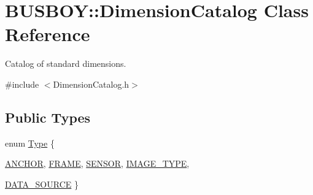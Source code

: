 \hypertarget{classBUSBOY_1_1DimensionCatalog}{
\section{BUSBOY::DimensionCatalog Class Reference}
\label{classBUSBOY_1_1DimensionCatalog}
}


Catalog of standard dimensions.  


{\ttfamily \#include $<$DimensionCatalog.h$>$}\subsection*{Public Types}
\begin{DoxyCompactItemize}
\item 
enum \hyperlink{classBUSBOY_1_1DimensionCatalog_a46badf3aaaba8629b5ccf8b63b4d1fe5}{Type} \{ \par
\hyperlink{classBUSBOY_1_1DimensionCatalog_a46badf3aaaba8629b5ccf8b63b4d1fe5a159ff66c002b825e50af94b6d855de92}{ANCHOR}, 
\hyperlink{classBUSBOY_1_1DimensionCatalog_a46badf3aaaba8629b5ccf8b63b4d1fe5a0334c4a83a6070bf9518079e5a69f970}{FRAME}, 
\hyperlink{classBUSBOY_1_1DimensionCatalog_a46badf3aaaba8629b5ccf8b63b4d1fe5aa12c5de92e87a7cf37114891062fc96a}{SENSOR}, 
\hyperlink{classBUSBOY_1_1DimensionCatalog_a46badf3aaaba8629b5ccf8b63b4d1fe5aa553f32887051631ee3e50cfdaa76826}{IMAGE\_\-TYPE}, 
\par
\hyperlink{classBUSBOY_1_1DimensionCatalog_a46badf3aaaba8629b5ccf8b63b4d1fe5a72ea26ff8fcb1cb43f337c1296ef901c}{DATA\_\-SOURCE}
 \}
\end{DoxyCompactItemize}
